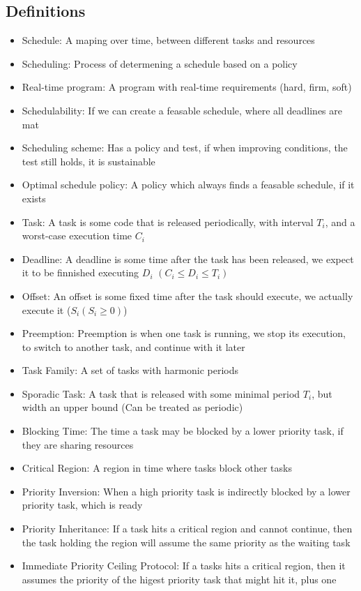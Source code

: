 \documentclass{article}
\begin{document}
		\subsection{Definitions}
			\begin{itemize}
				\item Schedule: A maping over time, between different tasks and resources
				\item Scheduling: Process of determening a schedule based on a policy
				\item Real-time program: A program with real-time requirements (hard, firm, soft)
				\item Schedulability: If we can create a feasable schedule, where all deadlines are mat
				\item Scheduling scheme: Has a policy and test, if when improving conditions, the test still holds, it is sustainable
				\item Optimal schedule policy: A policy which always finds a feasable schedule, if it exists
				\item Task: A task is some code that is released periodically, with interval $T_i$, and a worst-case execution time $C_i$
				\item Deadline: A deadline is some time after the task has been released, we expect it to be finnished executing $D_i$ $(C_i\leq D_i\leq T_i)$
				\item Offset: An offset is some fixed time after the task should execute, we actually execute it ($S_i (S_i\geq0)$)
				\item Preemption: Preemption is when one task is running, we stop its execution, to switch to another task, and continue with it later
				\item Task Family: A set of tasks with harmonic periods
				\item Sporadic Task: A task that is released with some minimal period $T_i$, but width an upper bound (Can be treated as periodic)
				\item Blocking Time: The time a task may be blocked by a lower priority task, if they are sharing resources
				\item Critical Region: A region in time where tasks block other tasks
				\item Priority Inversion: When a high priority task is indirectly blocked by a lower priority task, which is ready
				\item Priority Inheritance: If a task hits a critical region and cannot continue, then the task holding the region will assume the same priority as the waiting task
				\item Immediate Priority Ceiling Protocol: If a tasks hits a critical region, then it assumes the priority of the higest priority task that might hit it, plus one
			\end{itemize}
\end{document}
